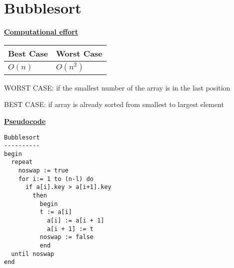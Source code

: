 \documentclass[a4paper]{report}
\begin{document}
\chapter*{Bubblesort}

\underline{\bf{Computational effort}}

\begin{tabular}{|l|l|}
\hline
Best Case & Worst Case \\ \hline
$O(n) $     & $O(n^2)$ \\ \hline
\end{tabular}

WORST CASE: if the smallest number of the array is in the last position



BEST CASE: if array is already sorted from smallest to largest element

\underline{\bf{Pseudocode}}

\begin{lstlisting}
Bubblesort
----------
begin 
  repeat
    noswap := true
    for i:= 1 to (n-l) do
      if a[i].key > a[i+1].key
      	then
      	  begin
      	  t := a[i]
            a[i] := a[i + 1]
            a[i + 1] := t
          noswap := false
          end
  until noswap
end
\end{lstlisting}
\end{document}
